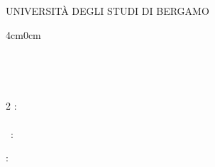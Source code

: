 \makeatletter
\begin{center}
  {\Large{UNIVERSITÀ DEGLI STUDI DI BERGAMO}}
\end{center}



\begin{changemargin}{4cm}{0cm}
  \@trDepartment \\
  \@department

  \vspace{0.5cm}

  \@trCourseB \\
  \@course

  \vspace{0.1cm}

  \@trClass~\@class

  \vfill

  {\Huge\textbf{\@title}}

  {\LARGE\@subtitle}

  \vfill

  \begin{multicols}{2}
  : \\
  \textit{\@authors} \\
    {\@trStudentNumber~\@studentids}{\@trStudentNumbers: \\ \@studentids}

  \columnbreak
  
  \@trAdvisor: \\ \textit{\@advisor}
  
  \vspace{0.5cm}
  

  \end{multicols}

  \vfill

  \@trAnnoAccademico \\
  \@academicyear

\end{changemargin}
\makeatother
